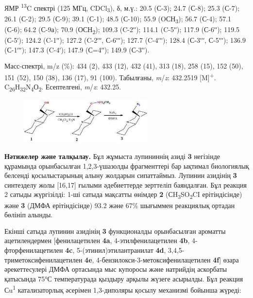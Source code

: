 \begin{multicols}{2}
ЯМР \textsuperscript{13}C спектрі (125 МГц, CDCl\textsubscript{3}), δ,
м.ү.: 20.5 (С-3); 24.7 (С-8); 25.3 (С-7); 26.1 (С-2); 29.5 (С-9); 39.1
(С-1); 48.5 (С-10); 55.9 (OСН\textsubscript{3}); 56.7 (С-4); 57.1 (С-6);
64.2 (С-9а); 70.9 (ОСН\textsubscript{2}); 109.3 (C-2ʹʹ); 114.1 (C-5ʹʹ);
117.9 (С-6ʹʹ); 119.5 (С-5ʹ); 124.2 (C-1ʹʹ); 127.2 (C-2ʹʹʹ, С-6ʹʹʹ);
127.7 (C-4ʹʹʹ); 128.4 (С-3ʹʹʹ, С-5ʹʹʹ); 136.9 (С-1ʹʹʹ); 147.3 (C-4ʹ);
147.9 (С=4ʹʹ); 149.9 (С-3ʹʹ).

Масс-спектрі, m/z (\%): 434 (2), 433 (12), 432 (41), 313 (18), 258 (15),
152 (50), 151 (52), 150 (38), 136 (17), 91 (100). Табылғаны,
\emph{m}/\emph{z}: 432.2519 {[}M{]}\textsuperscript{+}.
C\textsubscript{26}H\textsubscript{32}N\textsubscript{4}О\textsubscript{2}.
Есептелгені, \emph{m}/\emph{z}: 432.25.
\end{multicols}

\begin{figure}[H]
	\centering
	\includegraphics[width=0.6\textwidth]{assets/1011}
	\caption*{}
\end{figure}

\begin{multicols}{2}
{\bfseries Нәтижелер және талқылау.} Бұл жұмыста лупининнің азиді
{\bfseries 3} негізінде құрамында орынбасылған 1,2,3-үшазолды фрагменттері
бар ықтимал биологиялық белсенді қосылыстарының алыну жолдарын
сипаттаймыз. Лупинин азидінің {\bfseries 3} синтезделу жолы {[}16,17{]}
ғылыми әдебиеттерде зерттеліп баяндалған. Бұл реакция 2 сатыды
жүргізілді: 1-ші сатыда мақсатты өнімдер {\bfseries 2}
(СH\textsubscript{3}SO\textsubscript{2}CI ерітіндісінде) және {\bfseries 3}
(ДМФА ерітіндісінде) 93.2 және 67\% шығыммен реакциялық ортадан бөлініп
алынды.

Екінші сатыда лупинин азидінің {\bfseries 3} функционалды орынбасылған
ароматты ацетилендермен {[}фенилацетилен {\bfseries 4a},
4-этилфенилацетилен {\bfseries 4b}, 4-фторфенилацетилен {\bfseries 4c},
5-(этинил)этилантранилат {\bfseries 4d}, 3,4,5-триметоксифенилацетилен
{\bfseries 4e}, 4-бензилокси-3-метоксифенилацетилен {\bfseries 4f}{]} өзара
әрекеттесулері ДМФА ортасында мыс купоросы және натрийдің аскорбаты
қатысында 75°С температурада қыздыру арқылы жүзеге асырылды. Бұл реакция
Сu\textsuperscript{1} катализаторлық әсерімен 1,3-диполяры қосылу
механизмі бойынша жүреді:
\end{multicols}

